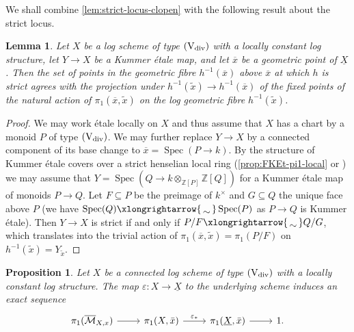 \documentclass[a4paper,twoside,11pt,reqno]{amsart}
\renewcommand{\mathbb}{\mathds}
\newcommand{\bZ}{{\mathbb Z}}
\newcommand{\cM}{{\mathcal M}}
\newcommand{\isomto}{\xlongrightarrow{\,\smash{\raisebox{-0.65ex} 
    {\ensuremath{\displaystyle\sim}}}\,}}
\DeclareMathOperator{\Spec}{Spec}
\newcommand{\ov}[1]{\overline{#1}}
\newcommand{\ep}{\varepsilon}
\newcommand{\typeVd}{(\mathrm{V}_{\rm div})}
\newtheorem{prop}[thm]{Proposition}
\newtheorem{lem}[thm]{Lemma}
\theoremstyle{definition}
\numberwithin{equation}{subsection}
\begin{document}
We shall combine \cref{lem:strict-locus-clopen} with the following result about the strict locus.

\begin{lem} \label{lem:criterion strict}
    Let $X$ be a log scheme of type $\typeVd$ with a locally constant log structure, let $Y\to X$ be a Kummer \'etale map, and let $\ov x$ be a geometric point of $\underline{X}$.  Then the set of points in the geometric fibre $h^{-1}(\ov x)$ above $\ov x$ at which $h$ is strict agrees with the projection under $h^{-1}(\tilde{x}) \to h^{-1}(\ov x)$ of the 
    fixed points of the natural action of $\pi_1(\ov x,\tilde x)$ on the log geometric fibre $h^{-1}(\tilde x)$.
\end{lem}

\begin{proof}
We may work \'etale locally on $X$ and thus assume that $X$ has a chart by a monoid $P$ of type $\typeVd$.
We may further replace $Y \to X$ by a connected component of its base change to $\ov x = \Spec(P\to k)$. By the structure of Kummer \'etale covers over a strict henselian local ring (\cref{prop:FKEt-pi1-local} or \cite[Lemma~4.2.7]{AHLS-Log}) we may assume that $Y = \Spec(Q\to k\otimes_{\bZ[P]}\bZ[Q])$ for a Kummer \'etale map of monoids $P \to Q$. Let $F \subseteq P$ be the preimage of $k^\times$ and $G\subseteq Q$ the unique face above $P$ (we have $\Spec(Q)\isomto\Spec(P)$ as $P\to Q$ is Kummer \'etale). Then $Y\to X$ is strict if and only if $P/F\isomto Q/G$, which translates into the trivial action of $\pi_1(\ov{x},\tilde{x}) = \pi_1(P/F)$ on $h^{-1}(\tilde x) = Y_{\tilde x}$.
\end{proof}

\begin{prop} \label{prop:torus-fibration-pi1}
    Let $X$ be a connected log scheme of type $\typeVd$ with a locally constant log structure. 
    The map $\ep\colon X \to \underline{X}$ to the underlying scheme induces an exact sequence
    \[
        \begin{tikzcd}
            \pi_1(\ov \cM_{X,x}) \ar[r] & \pi_1(X,\bar x) \ar[r,"\ep_\ast"] & \pi_1(\underline{X},\bar x) \ar[r] & 1.
        \end{tikzcd}
    \]
\end{prop}
\end{document}
